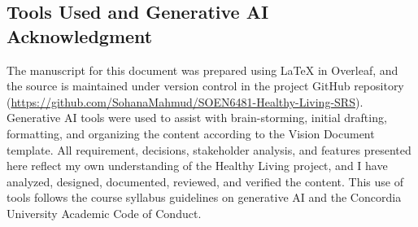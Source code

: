 \documentclass[11pt,a4paper]{article}
\newcommand{\githublink}{https://github.com/SohanaMahmud/SOEN6481-Healthy-Living-SRS}
\begin{document}
\subsection{Tools Used and Generative AI Acknowledgment}

The manuscript for this document was prepared using LaTeX in Overleaf, and the source is maintained under version control in the project GitHub repository (\url{\githublink}). Generative AI tools were used to assist with brain-storming, initial drafting, formatting, and organizing the content according to the Vision Document template. All requirement, decisions, stakeholder analysis, and features presented here reflect my own understanding of the Healthy Living project, and I have analyzed, designed, documented, reviewed, and verified the content. This use of tools follows the course syllabus guidelines on generative AI and the Concordia University Academic Code of Conduct.

\medskip
{\footnotesize\itshape }
\end{document}
